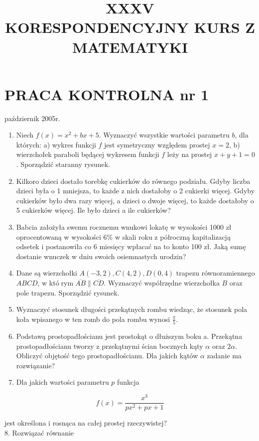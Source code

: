 \documentclass[10pt]{article}
\title{XXXV \\
 KORESPONDENCYJNY KURS Z MATEMATYKI }
\author{}
\date{}
\begin{document}
\maketitle
\section*{PRACA KONTROLNA nr 1}
październik 2005r.

\begin{enumerate}
  \item Niech $f(x)=x^{2}+b x+5$. Wyznaczyć wszystkie wartości parametru $b$, dla których: a) wykres funkcji $f$ jest symetryczny względem prostej $x=2$, b) wierzchołek paraboli będącej wykresem funkcji $f$ leży na prostej $x+y+1=0$. Sporządzić staranny rysunek.
  \item Kilkoro dzieci dostało torebkę cukierków do równego podziału. Gdyby liczba dzieci była o 1 mniejsza, to każde z nich dostałoby o 2 cukierki więcej. Gdyby cukierków było dwa razy więcej, a dzieci o dwoje więcej, to każde dostałoby o 5 cukierków więcej. Ile było dzieci a ile cukierków?
  \item Babcia założyła swemu rocznemu wnukowi lokatę w wysokości 1000 zł oprocentowaną w wysokości $6 \%$ w skali roku z półroczną kapitalizacją odsetek i postanowiła co 6 miesięcy wpłacać na to konto 100 zł. Jaką sumę dostanie wnuczek w dniu swoich osiemnastych urodzin?
  \item Dane są wierzchołki $A(-3,2), C(4,2), D(0,4)$ trapezu równoramiennego $A B C D$, w któ$\operatorname{rym} \overline{A B} \| \overline{C D}$. Wyznaczyć współrzędne wierzchołka $B$ oraz pole trapezu. Sporządzić rysunek.
  \item Wyznaczyć stosunek długości przekątnych rombu wiedząc, że stosunek pola koła wpisanego w ten romb do pola rombu wynosi $\frac{\pi}{5}$.
  \item Podstawą prostopadłościanu jest prostokąt o dłuższym boku a. Przekątna prostopadłościanu tworzy z przekątnymi ścian bocznych kąty $\alpha$ oraz $2 \alpha$. Obliczyć objętość tego prostopadłościanu. Dla jakich kątów $\alpha$ zadanie ma rozwiązanie?
  \item Dla jakich wartości parametru $p$ funkcja
\end{enumerate}

$$
f(x)=\frac{x^{3}}{p x^{2}+p x+1}
$$

jest określona i rosnąca na całej prostej rzeczywistej?\\
8. Rozwiązać równanie
\end{document}
